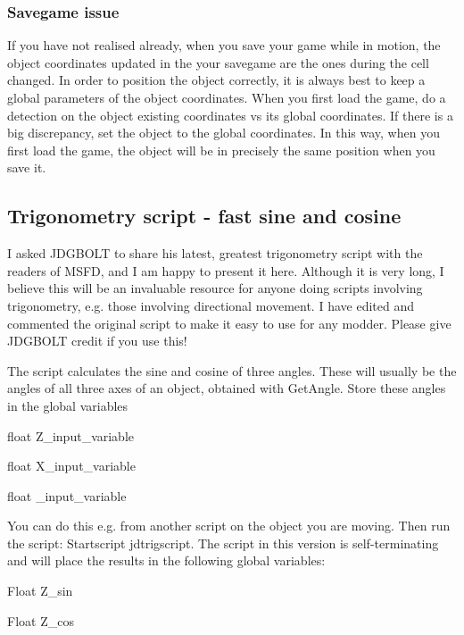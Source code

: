\documentclass[
]{article}
\begin{document}
\hypertarget{savegame-issue}{%
\subsubsection{\texorpdfstring{Savegame issue
}{Savegame issue }}\label{savegame-issue}}

If you have not realised already, when you save your game while in
motion, the object coordinates updated in the your savegame are the ones
during the cell changed. In order to position the object correctly, it
is always best to keep a global parameters of the object coordinates.
When you first load the game, do a detection on the object existing
coordinates vs its global coordinates. If there is a big discrepancy,
set the object to the global coordinates. In this way, when you first
load the game, the object will be in precisely the same position when
you save it.

\hypertarget{trigonometry-script---fast-sine-and-cosine}{%
\subsection{\texorpdfstring{\hfill\break
Trigonometry script - fast sine and
cosine}{ Trigonometry script - fast sine and cosine}}\label{trigonometry-script---fast-sine-and-cosine}}

I asked JDGBOLT to share his latest, greatest trigonometry script with
the readers of MSFD, and I am happy to present it here. Although it is
very long, I believe this will be an invaluable resource for anyone
doing scripts involving trigonometry, e.g. those involving directional
movement. I have edited and commented the original script to make it
easy to use for any modder. Please give JDGBOLT credit if you use this!

The script calculates the sine and cosine of three angles. These will
usually be the angles of all three axes of an object, obtained with
GetAngle. Store these angles in the global variables

float Z\_input\_variable

float X\_input\_variable

float \_input\_variable

You can do this e.g. from another script on the object you are moving.
Then run the script: Startscript jdtrigscript. The script in this
version is self-terminating and will place the results in the following
global variables:

Float Z\_sin

Float Z\_cos
\end{document}
